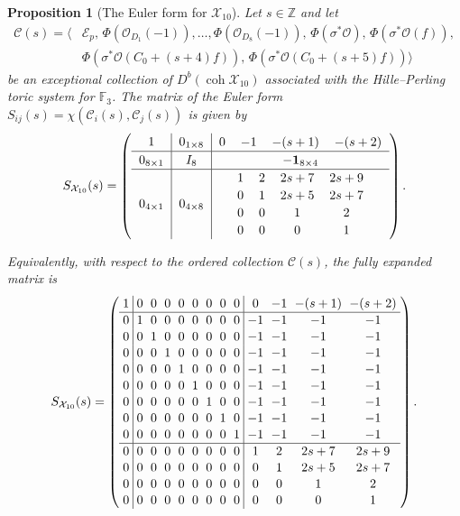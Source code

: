 \documentclass[11pt]{article}
\theoremstyle{plain}
\newtheorem{proposition}[proposition]{Proposition}
\theoremstyle{definition}
\theoremstyle{remark}
\newcommand{\F}{\mathbb F}
\newcommand{\Z}{\mathbb Z}
\newcommand{\coh}{\operatorname{coh}}
\newcommand{\OO}{\mathcal O}
\begin{document}
\begin{proposition}[The Euler form for \(\mathcal X_{10}\)]
\label{prop:X10-euler-form}
Let \(s\in\Z\) and let
\[
\begin{aligned}
\mathcal C(s)=
\big\langle
&\mathcal E_p,\,
\Phi(\OO_{D_1}(-1)),\ldots,\Phi(\OO_{D_8}(-1)),\,
\Phi(\sigma^*\OO),\,\Phi(\sigma^*\OO(f)),\\
&\Phi(\sigma^*\OO(C_0+(s+4)f)),\,
\Phi(\sigma^*\OO(C_0+(s+5)f))
\big\rangle 
\end{aligned}
\]
be an exceptional collection of \(D^b(\coh \mathcal X_{10})\) associated with the Hille--Perling toric system for \(\F_3\). The matrix of the Euler form \(S_{ij}(s)=\chi(\mathcal C_i(s),\mathcal C_j(s))\)
is given by
\[
\begingroup
\setlength{\arraycolsep}{6pt}
\renewcommand{\arraystretch}{1.15}
S_{\mathcal X_{10}}(s)
=
\left(
\begin{array}{c|c|c}
1
&
0_{1\times 8}
&
\begin{matrix}
0&-1&-(s+1)&-(s+2)
\end{matrix}
\\ \hline
0_{8\times 1}
&
I_8
&
-\mathbf 1_{8\times 4}
\\ \hline
0_{4\times 1}
&
0_{4\times 8}
&
\begin{matrix}
1&2&2s+7&2s+9\\
0&1&2s+5&2s+7\\
0&0&1&2\\
0&0&0&1
\end{matrix}
\end{array}
\right).
\endgroup
\]

Equivalently, with respect to the ordered collection \(\mathcal C(s)\), the fully expanded matrix is
\[
\begingroup
\setlength{\arraycolsep}{3pt}
\renewcommand{\arraystretch}{1.08}
S_{\mathcal X_{10}}(s)
=
\left(
\begin{array}{c|cccccccc|cccc}
1
&0&0&0&0&0&0&0&0
&0&-1&-(s+1)&-(s+2)\\ \hline
0&1&0&0&0&0&0&0&0&-1&-1&-1&-1\\
0&0&1&0&0&0&0&0&0&-1&-1&-1&-1\\
0&0&0&1&0&0&0&0&0&-1&-1&-1&-1\\
0&0&0&0&1&0&0&0&0&-1&-1&-1&-1\\
0&0&0&0&0&1&0&0&0&-1&-1&-1&-1\\
0&0&0&0&0&0&1&0&0&-1&-1&-1&-1\\
0&0&0&0&0&0&0&1&0&-1&-1&-1&-1\\
0&0&0&0&0&0&0&0&1&-1&-1&-1&-1\\ \hline
0&0&0&0&0&0&0&0&0&1&2&2s+7&2s+9\\
0&0&0&0&0&0&0&0&0&0&1&2s+5&2s+7\\
0&0&0&0&0&0&0&0&0&0&0&1&2\\
0&0&0&0&0&0&0&0&0&0&0&0&1
\end{array}
\right).
\endgroup
\]
\end{proposition}
\end{document}
